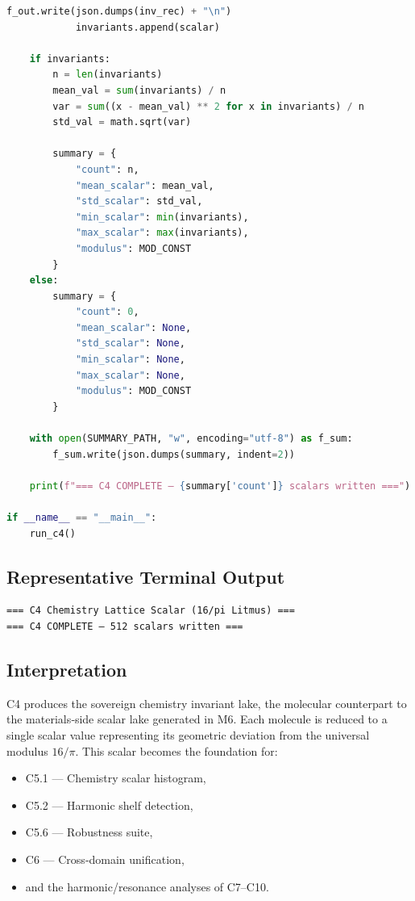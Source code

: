 \documentclass[11pt, letterpaper, openany]{book}
\begin{document}
\begin{lstlisting}[language=Python, caption={C4}]
            f_out.write(json.dumps(inv_rec) + "\n")
            invariants.append(scalar)

    if invariants:
        n = len(invariants)
        mean_val = sum(invariants) / n
        var = sum((x - mean_val) ** 2 for x in invariants) / n
        std_val = math.sqrt(var)

        summary = {
            "count": n,
            "mean_scalar": mean_val,
            "std_scalar": std_val,
            "min_scalar": min(invariants),
            "max_scalar": max(invariants),
            "modulus": MOD_CONST
        }
    else:
        summary = {
            "count": 0,
            "mean_scalar": None,
            "std_scalar": None,
            "min_scalar": None,
            "max_scalar": None,
            "modulus": MOD_CONST
        }

    with open(SUMMARY_PATH, "w", encoding="utf-8") as f_sum:
        f_sum.write(json.dumps(summary, indent=2))

    print(f"=== C4 COMPLETE — {summary['count']} scalars written ===")

if __name__ == "__main__":
    run_c4()
\end{lstlisting}

\subsection*{Representative Terminal Output}
\begin{lstlisting}[style=terminal]
=== C4 Chemistry Lattice Scalar (16/pi Litmus) ===
=== C4 COMPLETE — 512 scalars written ===
\end{lstlisting}

\subsection*{Interpretation}
C4 produces the sovereign chemistry invariant lake, the molecular counterpart to
the materials‑side scalar lake generated in M6. Each molecule is reduced to a
single scalar value representing its geometric deviation from the universal
modulus \(16/\pi\). This scalar becomes the foundation for:

\begin{itemize}
    \item C5.1 — Chemistry scalar histogram,
    \item C5.2 — Harmonic shelf detection,
    \item C5.6 — Robustness suite,
    \item C6 — Cross‑domain unification,
    \item and the harmonic/resonance analyses of C7–C10.
\end{itemize}
\end{document}
